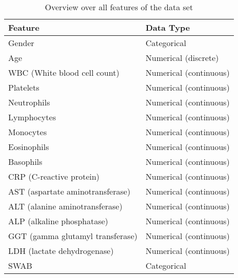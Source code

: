 \begin{table}
\centering
\begin{tabular}{ll}
Feature                          & Data Type              \\ \hline
Gender                           & Categorical            \\
Age                              & Numerical (discrete)   \\
WBC (White blood cell count)     & Numerical (continuous) \\
Platelets                        & Numerical (continuous) \\
Neutrophils                      & Numerical (continuous) \\
Lymphocytes                      & Numerical (continuous) \\
Monocytes                        & Numerical (continuous) \\
Eosinophils                      & Numerical (continuous) \\
Basophils                        & Numerical (continuous) \\
CRP (C-reactive protein)         & Numerical (continuous) \\
AST (aspartate aminotransferase) & Numerical (continuous) \\
ALT (alanine aminotransferase)   & Numerical (continuous) \\
ALP (alkaline phosphatase)       & Numerical (continuous) \\
GGT (gamma glutamyl transferase) & Numerical (continuous) \\
LDH (lactate dehydrogenase)      & Numerical (continuous) \\
SWAB                             & Categorical           
\end{tabular}
\caption{Overview over all features of the data set}
\label{tab:overview-features}
\end{table}
